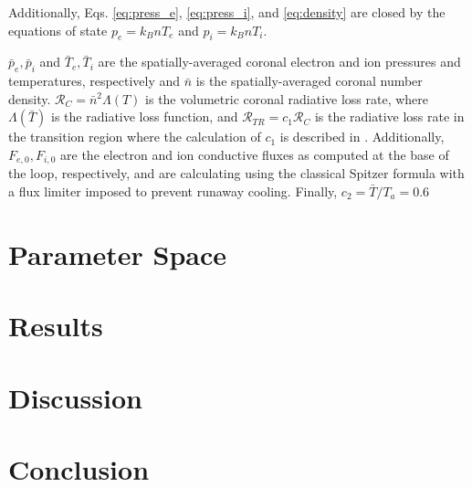 \documentclass[iop]{emulateapj}
\begin{document}
	Additionally, Eqs. \ref{eq:press_e}, \ref{eq:press_i}, and \ref{eq:density} are closed by the equations of state $p_e=k_BnT_e$ and $p_i=k_BnT_i$.
	\par $\bar{p}_e,\bar{p}_i$ and $\bar{T}_e,\bar{T}_i$ are the spatially-averaged coronal electron and ion pressures and temperatures, respectively and $\bar{n}$ is the spatially-averaged coronal number density. $\mathcal{R}_C=\bar{n}^2\Lambda(T)$ is the volumetric coronal radiative loss rate, where $\Lambda(\bar{T})$ is the radiative loss function, and $\mathcal{R}_{TR}=c_1\mathcal{R}_C$ is the radiative loss rate in the transition region where the calculation of $c_1$ is described in \citet{cargill_enthalpy-based_2012}. Additionally, $F_{e,0},F_{i,0}$ are the electron and ion conductive fluxes as computed at the base of the loop, respectively, and are calculating using the classical Spitzer formula with a flux limiter imposed to prevent runaway cooling. Finally, $c_2=\bar{T}/T_a=0.6$
	\section{Parameter Space}
	\section{Results}
	\section{Discussion}
	\section{Conclusion}
	
	
	
\end{document}
